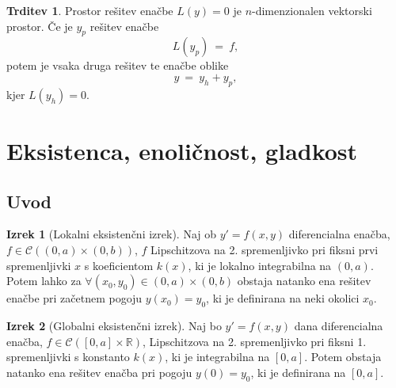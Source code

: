 \documentclass[11pt]{article}
\newcommand{\R}{\mathbb{R}}
\newcommand{\C}{\mathcal{C}}
\theoremstyle{definition}
\theoremstyle{definition}
\newtheorem{trditev}{Trditev}[section]
\theoremstyle{definition}
\newtheorem{izrek}{Izrek}[section]
\theoremstyle{definition}
\begin{document}
\begin{trditev}

Prostor rešitev enačbe $L(y) = 0$ je $n$-dimenzionalen vektorski prostor. Če je $y_p$ rešitev enačbe
$$L(y_p) ~=~ f,$$
potem je vsaka druga rešitev te enačbe oblike
$$y ~=~ y_h + y_p,$$
kjer $L(y_h) = 0$.

\end{trditev}
\vspace{0.5cm}


\pagebreak


\section{Eksistenca, enoličnost, gladkost}
\vspace{0.5cm}


\subsection{Uvod}
\vspace{0.5cm}

\begin{izrek}[Lokalni eksistenčni izrek]

Naj ob $y' = f(x,y)$ diferencialna enačba, $f \in \C((0,a)\times(0,b))$, $f$ Lipschitzova na 2. spremenljivko pri fiksni prvi spremenljivki $x$ s koeficientom $k(x)$, ki je lokalno integrabilna na $(0,a)$. Potem lahko za $\forall (x_0,y_0) \in (0,a) \times (0,b)$ obstaja natanko ena rešitev enačbe pri začetnem pogoju $y(x_0) = y_0$, ki je definirana na neki okolici $x_0$. 

\end{izrek}
\vspace{0.5cm}

\begin{izrek}[Globalni eksistenčni izrek]

Naj bo $y' = f(x,y)$ dana diferencialna enačba, $f \in \C([0,a] \times \R)$, Lipschitzova na 2. spremenljivko pri fiksni 1. spremenljivki s konstanto $k(x)$, ki je integrabilna na $[0,a]$. Potem obstaja natanko ena rešitev enačba pri pogoju $y(0) = y_0$, ki je definirana na $[0,a]$.

\end{izrek}
\vspace{0.5cm}


\pagebreak

\end{document}
